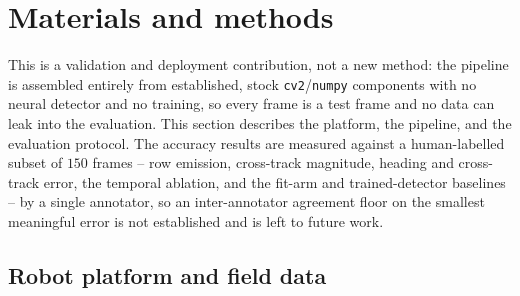 %
%

\section{Materials and methods}
\label{sec:method}

\noindent This is a validation and deployment contribution, not a new method: the pipeline is assembled
entirely from established, stock \texttt{cv2}/\texttt{numpy} components with no neural detector and no
training, so every frame is a test frame and no data can leak into the evaluation. This section describes the
platform, the pipeline, and the evaluation protocol. The accuracy results are measured against a
human-labelled subset of $150$ frames -- row emission, cross-track magnitude, heading and cross-track error,
the temporal ablation, and the fit-arm and trained-detector baselines -- by a single annotator, so an
inter-annotator agreement floor on the smallest meaningful error is not established and is left to future
work.



\subsection{Robot platform and field data}
\label{sec:method:platform}


